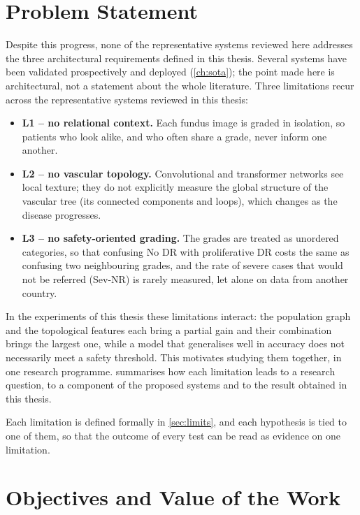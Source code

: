 \section*{Problem Statement}

Despite this progress, none of the representative systems reviewed here addresses the
three architectural requirements defined in this thesis. Several systems have been
validated prospectively and deployed (\cref{ch:sota}); the point made here is
architectural, not a statement about the whole literature. Three limitations recur across
the representative systems reviewed in this thesis:
\begin{itemize}[leftmargin=1.4em,itemsep=3pt]
\item \textbf{L1 -- no relational context.} Each fundus image is graded in isolation, so
patients who look alike, and who often share a grade, never inform one another.
\item \textbf{L2 -- no vascular topology.} Convolutional and transformer networks see local
texture; they do not explicitly measure the global structure of the vascular tree (its connected
components and loops), which changes as the disease progresses.
\item \textbf{L3 -- no safety-oriented grading.} The grades are treated as unordered
categories, so that confusing No DR with proliferative DR costs the same as confusing two
neighbouring grades, and the rate of severe cases that would not be referred (Sev-NR) is
rarely measured, let alone on data from another country.
\end{itemize}
In the experiments of this thesis these limitations interact: the population graph and the
topological features each bring a partial gain and their combination brings the largest
one, while a model that generalises well in accuracy does not necessarily meet a safety
threshold. This motivates studying them together, in one research programme.
 summarises how each limitation leads to a research question, to a component
of the proposed systems and to the result obtained in this thesis.

Each limitation is defined formally in \cref{sec:limits}, and each hypothesis is tied to
one of them, so that the outcome of every test can be read as evidence on one limitation.



\section*{Objectives and Value of the Work}

